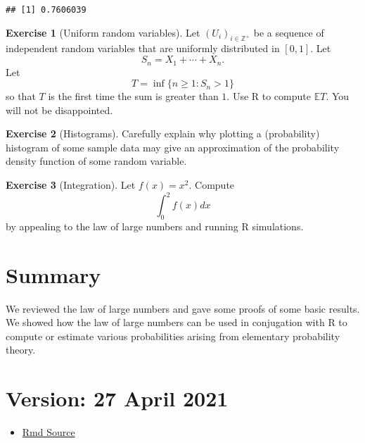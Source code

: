 \documentclass[
]{article}
\providecommand{\tightlist}{%
  \setlength{\itemsep}{0pt}\setlength{\parskip}{0pt}}
\theoremstyle{definition}
\theoremstyle{definition}
\theoremstyle{definition}
\newtheorem{exercise}{Exercise}[section]
\theoremstyle{remark}
\begin{document}
\begin{verbatim}
## [1] 0.7606039
\end{verbatim}

\begin{exercise}[Uniform random variables]
\protect\hypertarget{exr:unnamed-chunk-15}{}{\label{exr:unnamed-chunk-15} \iffalse (Uniform random variables) \fi{} }Let \((U_i)_{i \in \mathbb{Z} ^+}\) be a sequence of independent random variables that are uniformly distributed in \([0,1]\). Let
\[S_n = X_1 + \cdots + X_n.\]
Let \[T = \inf\{n \geq 1:  S_n >1\}\]
so that \(T\) is the first time the sum is greater than \(1\). Use R to compute \(\mathbb{E} T\). You will not be disappointed.
\end{exercise}
\begin{exercise}[Histograms]
\protect\hypertarget{exr:unnamed-chunk-16}{}{\label{exr:unnamed-chunk-16} \iffalse (Histograms) \fi{} }Carefully explain why plotting a (probability) histogram of some sample data may give an approximation of the probability density function of some random variable.
\end{exercise}

\begin{exercise}[Integration]
\protect\hypertarget{exr:unnamed-chunk-17}{}{\label{exr:unnamed-chunk-17} \iffalse (Integration) \fi{} }Let \(f(x) = x^2\). Compute
\[ \int_0 ^2 f(x)dx\]
by appealing to the law of large numbers and running R simulations.
\end{exercise}

\hypertarget{summary}{%
\section{Summary}\label{summary}}

We reviewed the law of large numbers and gave some proofs of some basic results. We showed how the law of large numbers can be used in conjugation with R to compute or estimate various probabilities arising from elementary probability theory.

\hypertarget{version-27-april-2021}{%
\section{Version: 27 April 2021}\label{version-27-april-2021}}

\begin{itemize}
\tightlist
\item
  \href{https://tsoo-math.github.io/ucl/prob-viaR.Rmd}{Rmd Source}
\end{itemize}
\end{document}

